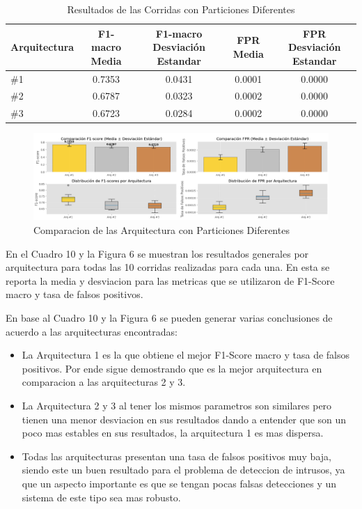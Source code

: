\documentclass[12pt,a4paper]{article}
\begin{document}
\begin{table}[ht]
  \centering
  \tiny
  \begin{tabular}{lcccc}
    \hline
    Arquitectura & F1-macro Media & F1-macro Desviación Estandar & FPR Media & FPR Desviación Estandar \\
    \hline
    \#1 & 0.7353 & 0.0431 & 0.0001 & 0.0000 \\
    \#2 & 0.6787 & 0.0323 & 0.0002 & 0.0000 \\
    \#3 & 0.6723 & 0.0284 & 0.0002 & 0.0000 \\
    \hline
  \end{tabular}
  \caption{Resultados de las Corridas con Particiones Diferentes}
  \label{tab:corridas_part_dt}
\end{table}

\begin{figure}[H]
  \centering
  \includegraphics[width=1\textwidth]{../img/ComparacionPartArqui.png}
  \caption{Comparacion de las Arquitectura con Particiones Diferentes}\label{fig:partition-architectures-decision-tree}
\end{figure}

En el Cuadro 10 y la Figura 6 se muestran los resultados generales por arquitectura para todas las 10 corridas realizadas para cada una.
En esta se reporta la media y desviacion para las metricas que se utilizaron de F1-Score macro y tasa de falsos positivos.

En base al Cuadro 10 y la Figura 6 se pueden generar varias conclusiones de acuerdo a las arquitecturas encontradas:

\begin{itemize}
  \item La Arquitectura 1 es la que obtiene el mejor F1-Score macro y tasa de falsos positivos. Por ende
    sigue demostrando que es la mejor arquitectura en comparacion a las arquitecturas 2 y 3.
  \item La Arquitectura 2 y 3 al tener los mismos parametros son similares pero tienen una menor desviacion en sus resultados
    dando a entender que son un poco mas estables en sus resultados, la arquitectura 1 es mas dispersa.
  \item Todas las arquitecturas presentan una tasa de falsos positivos muy baja, siendo este un buen resultado
    para el problema de deteccion de intrusos, ya que un aspecto importante es que se tengan pocas falsas detecciones
    y un sistema de este tipo sea mas robusto.
\end{itemize}
\end{document}
